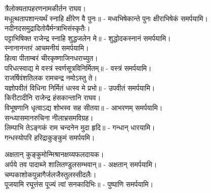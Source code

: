त्रैलोक्यतापहरणनामकीर्तन राघव।\\
मधूत्थतापशान्त्यर्थं स्नाहि क्षीरेण वै पुनः॥ - मध्वभिषेकान्ते पुनः क्षीराभिषेकं समर्पयामि।\\

नदीनदसमुद्रादितोयैर्मन्त्राभिसंस्कृतैः।\\
पट्टाभिषिक्त राजेन्द्र स्नाहि शुद्धजलेन मे॥ - शुद्धोदकस्नानं समर्पयामि।\\
स्नानानन्तरं आचमनीयं समर्पयामि।\\

हित्वा पीताम्बरं चीरकृष्णाजिनधराच्युत।\\
परिधत्स्वाद्य मे वस्त्रं स्वर्णसूत्रविनिर्मितम्॥ - वस्त्रं समर्पयामि।\\

राजर्षिवंशतिलक रामचन्द्र नमोऽस्तु ते।\\
यज्ञोपवीतं विधिना निर्मितं धत्स्व मे प्रभो॥ - उपवीतं समर्पयामि।\\

किरीटादीनि राजेन्द्र हंसकान्तानि राघव।\\
विभूषणानि धृत्वाऽद्य शोभस्व सह सीतया॥ - आभरणम् समर्पयामि।\\

सन्ध्यासमानरुचिना नीलाभ्रसमविग्रह।\\
लिम्पाभि तेऽङ्गकं राम चन्दनेन मुदा हृदि॥ - गन्धान् धारयामि।\\
गन्धस्योपरि हरिद्राकुङ्कुमं समर्पयमि।

अक्षतान् कुङ्कुमोन्मिश्रानक्षय्यफलदायक।\\
अर्पये तव पादाब्जे शालितण्डुलसम्भवान्॥ - अक्षतान् समर्पयामि।\\

चम्पकाशोकपुन्नागैर्जलजैस्तुलस्सीदलैः।\\
पूजयामि रघूत्तंस पूज्यं त्वां सनकादिभिः॥ - पुष्पाणि समर्पयामि।


